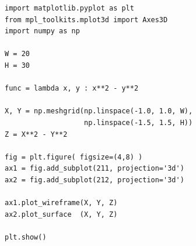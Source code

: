 
\begin{frame}[fragile]
%
\begin{codebox}[Example: 3D Surface ..., width=.6\linewidth, nobeforeafter, equal height group = grpXmp3DSurface]
\begin{verbatim}
import matplotlib.pyplot as plt
from mpl_toolkits.mplot3d import Axes3D
import numpy as np

W = 20
H = 30

func = lambda x, y : x**2 - y**2

X, Y = np.meshgrid(np.linspace(-1.0, 1.0, W),
                   np.linspace(-1.5, 1.5, H))
Z = X**2 - Y**2

fig = plt.figure( figsize=(4,8) )
ax1 = fig.add_subplot(211, projection='3d')
ax2 = fig.add_subplot(212, projection='3d')

ax1.plot_wireframe(X, Y, Z)
ax2.plot_surface  (X, Y, Z)

plt.show()


\end{verbatim}
\end{codebox}
\end{frame}
